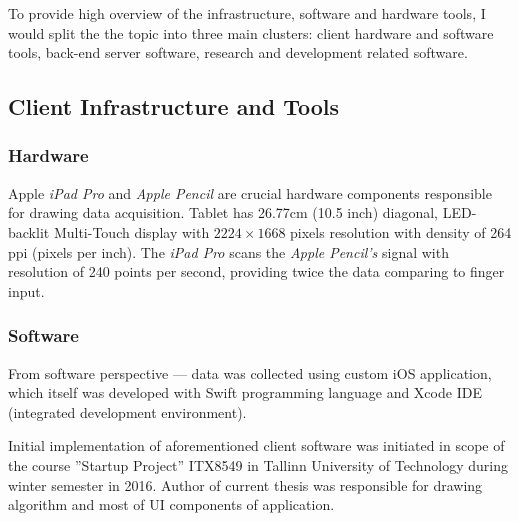 \begin{comment}

Keywords:

    - Hardware for data acquisition - iPad, iPencil
    
    - Client
        - iOS App, developed by author
    
    - Back-end
        - Amazon AWS
        - Flask
        
    - Analysis tools
        - PyCharm - for IDE
        - Python - Language for development
        - Libraries
            - Tensorflow, OpenCV, Pandas, Scikit-Learn - machine learning library for Python

\end{comment}

To provide high overview of the infrastructure, software and hardware tools, I would split the the topic into three main clusters: client hardware and software tools, back-end server software, research and development related software.

\subsection{Client Infrastructure and Tools}

\subsubsection{Hardware}
Apple \textit{iPad Pro} and \textit{Apple Pencil} are crucial hardware components responsible for drawing data acquisition. Tablet has 26.77cm (10.5 inch) diagonal, LED-backlit Multi-Touch display with $2224 \times 1668$ pixels resolution with density of 264 ppi (pixels per inch). The \textit{iPad Pro}  scans the \textit{Apple Pencil's} signal with resolution of 240 points per second, providing twice the data comparing to finger input.

\subsubsection{Software}
From software perspective --- data was collected using custom iOS application, which itself was developed with Swift programming language and Xcode IDE (integrated development environment). 

Initial implementation of aforementioned client software was initiated in scope of the course ”Startup Project” ITX8549 in Tallinn University of Technology during winter semester in 2016. Author of current thesis was responsible for drawing algorithm and most of UI components of application. 

